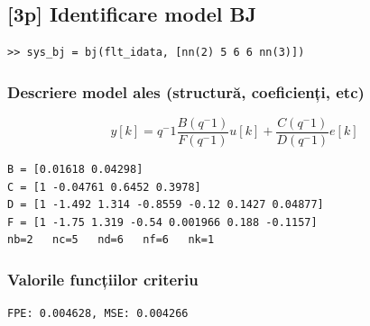 \documentclass[12pt,english]{article}
\begin{document}
\subsection {[3p] Identificare model BJ }
\begin{lstlisting}
>> sys_bj = bj(flt_idata, [nn(2) 5 6 6 nn(3)])
\end{lstlisting}
\subsubsection {Descriere model ales (structură, coeficienți, etc) }
\[ y[k] = q^-1 \dfrac{B(q^-1)}{F(q^-1)}u[k] + \dfrac{C(q^-1)}{D(q^-1)}e[k] \]

\begin{lstlisting}
B = [0.01618 0.04298]
C = [1 -0.04761 0.6452 0.3978]
D = [1 -1.492 1.314 -0.8559 -0.12 0.1427 0.04877]
F = [1 -1.75 1.319 -0.54 0.001966 0.188 -0.1157]
nb=2   nc=5   nd=6   nf=6   nk=1
\end{lstlisting}
\subsubsection {Valorile funcțiilor criteriu }
\begin{lstlisting}
FPE: 0.004628, MSE: 0.004266
\end{lstlisting}
\end{document}
